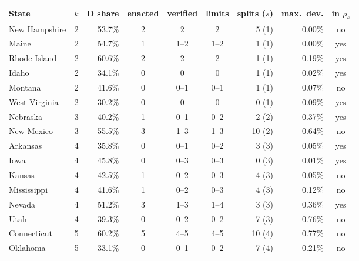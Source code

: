 \begin{tabular}{lrrcccrrc}
\toprule
State & $k$ & D share & enacted & verified & limits & splits ($s$) & max.\ dev. & in $\rho_s$ \\
\midrule
New Hampshire & 2 & 53.7\% & 2 & 2 & 2 & 5 (1) & 0.00\% & no \\
Maine & 2 & 54.7\% & 1 & 1--2 & 1--2 & 1 (1) & 0.00\% & yes \\
Rhode Island & 2 & 60.6\% & 2 & 2 & 2 & 1 (1) & 0.19\% & yes \\
Idaho & 2 & 34.1\% & 0 & 0 & 0 & 1 (1) & 0.02\% & yes \\
Montana & 2 & 41.6\% & 0 & 0--1 & 0--1 & 1 (1) & 0.07\% & no \\
West Virginia & 2 & 30.2\% & 0 & 0 & 0 & 0 (1) & 0.09\% & yes \\
Nebraska & 3 & 40.2\% & 1 & 0--1 & 0--2 & 2 (2) & 0.37\% & yes \\
New Mexico & 3 & 55.5\% & 3 & 1--3 & 1--3 & 10 (2) & 0.64\% & no \\
Arkansas & 4 & 35.8\% & 0 & 0--1 & 0--2 & 3 (3) & 0.05\% & yes \\
Iowa & 4 & 45.8\% & 0 & 0--3 & 0--3 & 0 (3) & 0.01\% & yes \\
Kansas & 4 & 42.5\% & 1 & 0--2 & 0--3 & 4 (3) & 0.05\% & no \\
Mississippi & 4 & 41.6\% & 1 & 0--2 & 0--3 & 4 (3) & 0.12\% & no \\
Nevada & 4 & 51.2\% & 3 & 1--3 & 1--4 & 3 (3) & 0.36\% & yes \\
Utah & 4 & 39.3\% & 0 & 0--2 & 0--2 & 7 (3) & 0.76\% & no \\
Connecticut & 5 & 60.2\% & 5 & 4--5 & 4--5 & 10 (4) & 0.77\% & no \\
Oklahoma & 5 & 33.1\% & 0 & 0--1 & 0--2 & 7 (4) & 0.21\% & no \\
\bottomrule
\end{tabular}
